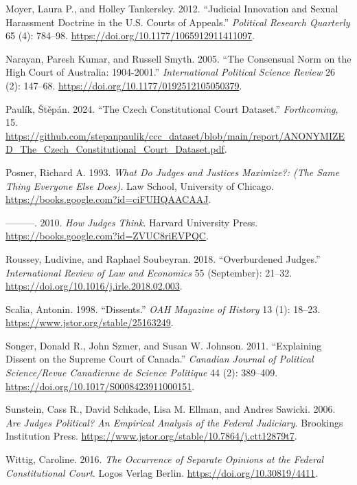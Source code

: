 \documentclass[
  11pt,
]{article}
\newlength{\cslhangindent}
\newenvironment{CSLReferences}[2] %
 {%
  \setlength{\parindent}{0pt}
  \ifodd #1 \everypar{\setlength{\hangindent}{\cslhangindent}}\ignorespaces\fi
  \ifnum #2 > 0
  \setlength{\parskip}{#2\baselineskip}
  \fi
 }%
 {}
\begin{document}
\begin{CSLReferences}{1}{0}
\leavevmode{}%
Moyer, Laura P., and Holley Tankersley. 2012. {``Judicial {Innovation}
and {Sexual Harassment Doctrine} in the {U}.{S}. {Courts} of
{Appeals}.''} \emph{Political Research Quarterly} 65 (4): 784--98.
\url{https://doi.org/10.1177/1065912911411097}.

\leavevmode{}%
Narayan, Paresh Kumar, and Russell Smyth. 2005. {``The {Consensual Norm}
on the {High Court} of {Australia}: 1904-2001.''} \emph{International
Political Science Review} 26 (2): 147--68.
\url{https://doi.org/10.1177/0192512105050379}.

\leavevmode{}%
Paulík, Štěpán. 2024. {``The {Czech Constitutional Court Dataset}.''}
\emph{Forthcoming}, 15.
\url{https://github.com/stepanpaulik/ccc_dataset/blob/main/report/ANONYMIZED_The_Czech_Constitutional_Court_Dataset.pdf}.

\leavevmode{}%
Posner, Richard A. 1993. \emph{What {Do Judges} and {Justices
Maximize}?: (The {Same Thing Everyone Else Does})}. Law School,
University of Chicago. \url{https://books.google.com?id=ciFUHQAACAAJ}.

\leavevmode{}%
---------. 2010. \emph{How {Judges Think}}. Harvard University Press.
\url{https://books.google.com?id=ZVUC8riEVPQC}.

\leavevmode{}%
Roussey, Ludivine, and Raphael Soubeyran. 2018. {``Overburdened
Judges.''} \emph{International Review of Law and Economics} 55
(September): 21--32. \url{https://doi.org/10.1016/j.irle.2018.02.003}.

\leavevmode{}%
Scalia, Antonin. 1998. {``Dissents.''} \emph{OAH Magazine of History} 13
(1): 18--23. \url{https://www.jstor.org/stable/25163249}.

\leavevmode{}%
Songer, Donald R., John Szmer, and Susan W. Johnson. 2011. {``Explaining
{Dissent} on the {Supreme Court} of {Canada}.''} \emph{Canadian Journal
of Political Science/Revue Canadienne de Science Politique} 44 (2):
389--409. \url{https://doi.org/10.1017/S0008423911000151}.

\leavevmode{}%
Sunstein, Cass R., David Schkade, Lisa M. Ellman, and Andres Sawicki.
2006. \emph{Are {Judges Political}? {An Empirical Analysis} of the
{Federal Judiciary}}. Brookings Institution Press.
\url{https://www.jstor.org/stable/10.7864/j.ctt12879t7}.

\leavevmode{}%
Wittig, Caroline. 2016. \emph{The {Occurrence} of {Separate Opinions} at
the {Federal Constitutional Court}}. Logos Verlag Berlin.
\url{https://doi.org/10.30819/4411}.

\end{CSLReferences}
\end{document}
